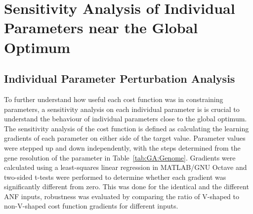 
\section{Sensitivity Analysis of Individual Parameters near the Global Optimum}\label{sec:GA:IndividualSensA}


\subsection{Individual Parameter Perturbation Analysis}\label{sec:GA:indiv-param-pert}

To further understand how useful each cost function was in
constraining parameters, a sensitivity analysis on each individual
parameter is is crucial to understand the behaviour of individual
parameters close to the global optimum.  The sensitivity analysis of
the cost function is defined as calculating the learning gradients of
each parameter on either side of the target value. Parameter values
were stepped up and down independently, with the steps determined from
the gene resolution of the parameter in
Table~\ref{tab:GA:Genome}. Gradients were calculated using a
least-squares linear regression in MATLAB/GNU Octave and two-sided
t-tests were performed to determine whether each gradient was
significantly different from zero.  This was done for the identical
and the different ANF inputs, robustness was evaluated by comparing
the ratio of V-shaped to non-V-shaped cost function gradients for
different inputs.

\smallskip{}

